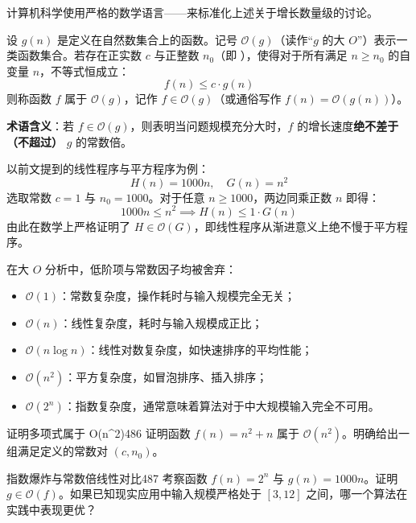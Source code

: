 
计算机科学使用严格的数学语言——来标准化上述关于增长数量级的讨论。

\begin{notebox}[大 $O$ 记号定义]
设 $g(n)$ 是定义在自然数集合上的函数。记号 $\mathcal{O}(g)$（读作“$g$ 的大 $O$”）表示一类函数集合。若存在正实数 $c$ 与正整数 $n_0$（即 ），使得对于所有满足 $n \ge n_0$ 的自变量 $n$，不等式恒成立：
\[ f(n) \le c \cdot g(n) \]
则称函数 $f$ 属于 $\mathcal{O}(g)$，记作 $f \in \mathcal{O}(g)$（或通俗写作 $f(n) = \mathcal{O}(g(n))$）。

\textbf{术语含义}：若 $f \in \mathcal{O}(g)$，则表明当问题规模充分大时，$f$ 的增长速度\textbf{绝不差于（不超过）} $g$ 的常数倍。
\end{notebox}

以前文提到的线性程序与平方程序为例：
\[ H(n) = 1000n, \quad G(n) = n^2 \]
选取常数 $c = 1$ 与 $n_0 = 1000$。对于任意 $n \ge 1000$，两边同乘正数 $n$ 即得：
\[ 1000n \le n^2 \implies H(n) \le 1 \cdot G(n) \]
由此在数学上严格证明了 $H \in \mathcal{O}(G)$，即线性程序从渐进意义上绝不慢于平方程序。

在大 $O$ 分析中，低阶项与常数因子均被舍弃：
\begin{itemize}
  \item $\mathcal{O}(1)$：常数复杂度，操作耗时与输入规模完全无关；
  \item $\mathcal{O}(n)$：线性复杂度，耗时与输入规模成正比；
  \item $\mathcal{O}(n \log n)$：线性对数复杂度，如快速排序的平均性能；
  \item $\mathcal{O}(n^2)$：平方复杂度，如冒泡排序、插入排序；
  \item $\mathcal{O}(2^n)$：指数复杂度，通常意味着算法对于中大规模输入完全不可用。
\end{itemize}

\begin{exercise}{证明多项式属于 O(n\textasciicircum 2)}{486}\label{ex:486}
证明函数 $f(n) = n^2 + n$ 属于 $\mathcal{O}(n^2)$。明确给出一组满足定义的常数对 $(c, n_0)$。
\end{exercise}

\begin{exercise}{指数爆炸与常数倍线性对比}{487}\label{ex:487}
考察函数 $f(n) = 2^n$ 与 $g(n) = 1000n$。证明 $g \in \mathcal{O}(f)$。如果已知现实应用中输入规模严格处于 $[3, 12]$ 之间，哪一个算法在实践中表现更优？
\end{exercise}

